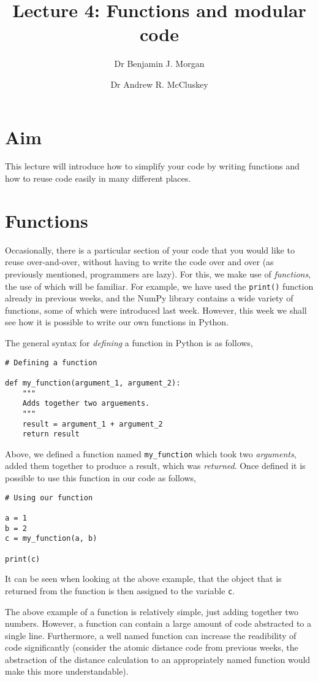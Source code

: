 \documentclass[a4paper]{article}
\title{Lecture 4: Functions and modular code}
\author[1]{Dr Benjamin J. Morgan}
\author[1,2]{Dr Andrew R. McCluskey}
\affil[1]{Department of Chemistry, University of Bath, email: b.j.morgan@bath.ac.uk}
\affil[2]{Diamond Light Source, email: andrew.mccluskey@diamond.ac.uk}
\begin{document}
\maketitle

\section*{Aim}
This lecture will introduce how to simplify your code by writing functions and how to reuse code easily in many different places.

\section{Functions}

Occasionally, there is a particular section of your code that you would like to reuse over-and-over, without having to write the code over and over (as previously mentioned, programmers are lazy).
For this, we make use of \emph{functions}, the use of which will be familiar.
For example, we have used the \texttt{print()} function already in previous weeks, and the NumPy library contains a wide variety of functions, some of which were introduced last week.
However, this week we shall see how it is possible to write our own functions in Python.

The general syntax for \emph{defining} a function in Python is as follows,
\begin{lstlisting}
# Defining a function

def my_function(argument_1, argument_2):
    """
    Adds together two arguements.
    """
    result = argument_1 + argument_2
    return result
\end{lstlisting}
Above, we defined a function named \texttt{my\_function} which took two \emph{arguments}, added them together to produce a result, which was \emph{returned}.
Once defined it is possible to use this function in our code as follows,
\begin{lstlisting}
# Using our function

a = 1
b = 2
c = my_function(a, b)

print(c)
\end{lstlisting}
It can be seen when looking at the above example, that the object that is returned from the function is then assigned to the variable \texttt{c}.

The above example of a function is relatively simple, just adding together two numbers.
However, a function can contain a large amount of code abstracted to a single line.
Furthermore, a well named function can increase the readibility of code significantly (consider the atomic distance code from previous weeks, the abstraction of the distance calculation to an appropriately named function would make this more understandable).
\end{document}
